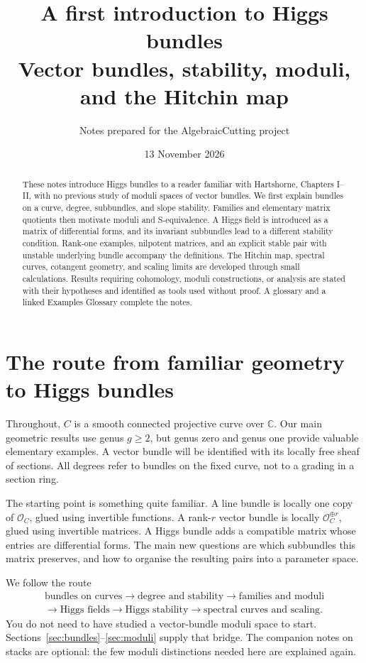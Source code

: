 \documentclass[11pt,a4paper]{article}
\title{A first introduction to Higgs bundles\\[5pt]
\large Vector bundles, stability, moduli, and the Hitchin map}
\author{Notes prepared for the AlgebraicCutting project}
\date{13 November 2026}
\numberwithin{equation}{section}
\theoremstyle{definition}
\newcommand{\OO}{\mathcal O}
\begin{document}
\maketitle
\begin{abstract}
These notes introduce Higgs bundles to a reader familiar with Hartshorne,
Chapters I--II, with no previous study of moduli spaces of vector bundles.
We first explain bundles on a curve, degree, subbundles, and slope stability.
Families and elementary matrix quotients then motivate moduli and
S-equivalence. A Higgs field is introduced as a matrix of differential forms,
and its invariant subbundles lead to a different stability condition.
Rank-one examples, nilpotent matrices, and an explicit stable pair with
unstable underlying bundle accompany the definitions. The Hitchin map,
spectral curves, cotangent geometry, and scaling limits are developed through
small calculations. Results requiring cohomology, moduli constructions,
or analysis are stated with their hypotheses and identified as tools used
without proof. A glossary and a linked Examples Glossary complete the notes.
\end{abstract}
\tableofcontents
\newpage

\section{The route from familiar geometry to Higgs bundles}
\label{sec:roadmap}

Throughout, $C$ is a smooth connected projective curve over $\mathbb C$.
Our main geometric results use genus $g\ge2$, but genus zero and genus one
provide valuable elementary examples. A vector bundle will be identified
with its locally free sheaf of sections. All degrees refer to bundles on
the fixed curve, not to a grading in a section ring.

The starting point is something quite familiar. A line bundle is locally
one copy of $\OO_C$, glued using invertible functions. A rank-$r$ vector
bundle is locally $\OO_C^{\oplus r}$, glued using invertible matrices.
A Higgs bundle adds a compatible matrix whose entries are differential
forms. The main new questions are which subbundles this matrix preserves,
and how to organise the resulting pairs into a parameter space.

We follow the route
\[
\begin{gathered}
\text{bundles on curves}\longrightarrow\text{degree and stability}
\longrightarrow\text{families and moduli}\\
\longrightarrow\text{Higgs fields}\longrightarrow\text{Higgs stability}
\longrightarrow\text{spectral curves and scaling}.
\end{gathered}
\]
You do not need to have studied a vector-bundle moduli space to start.
Sections~\ref{sec:bundles}--\ref{sec:moduli} supply that bridge.
The companion notes on stacks are optional: the few moduli distinctions
needed here are explained again.
\end{document}
